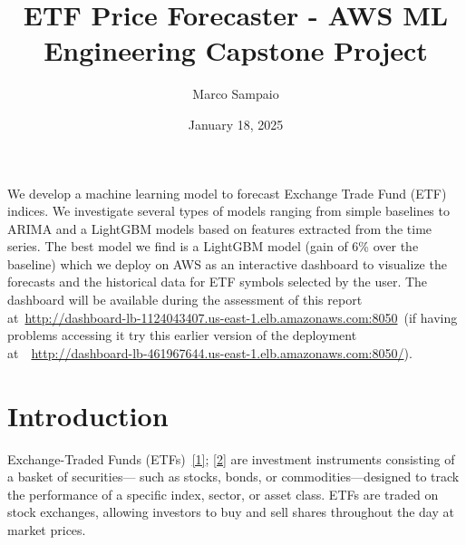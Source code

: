 \documentclass[10pt]{article}
\renewenvironment{abstract}
  {{\bfseries\noindent{\abstractname}\par\nobreak}\footnotesize}
  {\bigskip}
\begin{document}
\title{ETF Price Forecaster - AWS ML Engineering Capstone Project}



\author[1]{Marco Sampaio}%
%


\vspace{-1em}




  \date{January 18, 2025}


\begingroup
\let\center\flushleft
\let\endcenter\endflushleft
\maketitle
\endgroup





\begin{abstract}
We develop a machine learning model to forecast Exchange Trade Fund
(ETF) indices. We investigate several types of models ranging from
simple baselines to ARIMA and a LightGBM models based on features
extracted from the time series. The best model we find is a LightGBM
model (gain of 6\% over the baseline) which we deploy on AWS as an
interactive dashboard to visualize the forecasts and the historical data
for ETF symbols selected by the user. The dashboard will be available
during the assessment of this report
at~\url{http://dashboard-lb-1124043407.us-east-1.elb.amazonaws.com:8050}~(if
having problems accessing it try this earlier version of the deployment~
at~~\url{http://dashboard-lb-461967644.us-east-1.elb.amazonaws.com:8050/}).%
\end{abstract}%



\sloppy




\tableofcontents

\hypertarget{introduction}{%
\section{Introduction}}

{\label{265150}}

Exchange-Traded Funds (ETFs)~\hyperref[csl:1]{[1]}; \hyperref[csl:2]{[2]} are investment
instruments consisting of a basket of securities--- such as stocks,
bonds, or commodities---designed to track the performance of a specific
index, sector, or asset class. ETFs are traded on stock exchanges,
allowing investors to buy and sell shares throughout the day at market
prices.~
\end{document}
